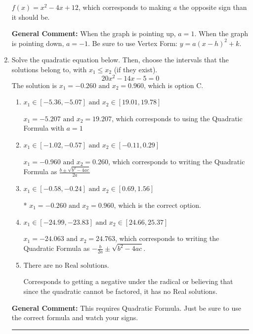 \documentclass{extbook}[14pt]
\newcommand{\litem}[1]{\item #1

\rule{\textwidth}{0.4pt}}
\begin{document}
\begin{enumerate}
{\begin{enumerate}[label=\Alph*.]
$f(x)=x^{2} -4 x + 12$, which corresponds to making $a$ the opposite sign than it should be.
\end{enumerate}

\textbf{General Comment:} When the graph is pointing up, $a=1$. When the graph is pointing down, $a=-1$. Be sure to use Vertex Form: $y = a(x-h)^2+k$.
}
\litem{
Solve the quadratic equation below. Then, choose the intervals that the solutions belong to, with $x_1 \leq x_2$ (if they exist).
\[ 20x^{2} -14 x -5 = 0 \]The solution is \( x_1 = -0.260 \text{ and } x_2 = 0.960 \), which is option C.\begin{enumerate}[label=\Alph*.]
\item \( x_1 \in [-5.36, -5.07] \text{ and } x_2 \in [19.01, 19.78] \)

 $x_1 = -5.207 \text{ and } x_2 = 19.207$, which corresponds to using the Quadratic Formula with $a=1$
\item \( x_1 \in [-1.02, -0.57] \text{ and } x_2 \in [-0.11, 0.29] \)

 $x_1 = -0.960 \text{ and } x_2 = 0.260$, which corresponds to writing the Quadratic Formula as $\frac{b \pm \sqrt{b^2 - 4ac}}{2a}$
\item \( x_1 \in [-0.58, -0.24] \text{ and } x_2 \in [0.69, 1.56] \)

* $x_1 = -0.260 \text{ and } x_2 = 0.960$, which is the correct option.
\item \( x_1 \in [-24.99, -23.83] \text{ and } x_2 \in [24.66, 25.37] \)

 $x_1 = -24.063 \text{ and } x_2 = 24.763$, which corresponds to writing the Quadratic Formula as $-\frac{b}{2a} \pm \sqrt{b^2 - 4ac}$.
\item \( \text{There are no Real solutions.} \)

Corresponds to getting a negative under the radical or believing that since the quadratic cannot be factored, it has no Real solutions.
\end{enumerate}

\textbf{General Comment:} This requires Quadratic Formula. Just be sure to use the correct formula and watch your signs.
}
\end{enumerate}
\end{document}
